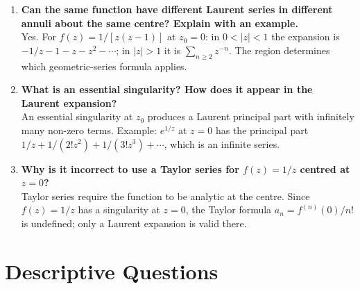 \documentclass[12pt,a4paper]{article}
\begin{document}
\begin{enumerate}[label=\textbf{Q\arabic*.}]
\item \textbf{Can the same function have different Laurent series in different annuli about the same centre? Explain with an example.}\\
Yes. For $f(z)=1/[z(z-1)]$ at $z_0=0$: in $0<|z|<1$ the expansion is
$-1/z - 1 - z - z^2 - \cdots$; in $|z|>1$ it is $\sum_{n\geq 2} z^{-n}$.
The region determines which geometric-series formula applies.

\item \textbf{What is an essential singularity? How does it appear in the Laurent expansion?}\\
An essential singularity at $z_0$ produces a Laurent principal part with infinitely many
non-zero terms. Example: $e^{1/z}$ at $z=0$ has the principal part
$1/z + 1/(2!z^2) + 1/(3!z^3) + \cdots$, which is an infinite series.

\item \textbf{Why is it incorrect to use a Taylor series for $f(z)=1/z$ centred at $z=0$?}\\
Taylor series require the function to be analytic at the centre. Since $f(z)=1/z$ has a
singularity at $z=0$, the Taylor formula $a_n = f^{(n)}(0)/n!$ is undefined; only a
Laurent expansion is valid there.

\end{enumerate}

\section{Descriptive Questions}
\end{document}
